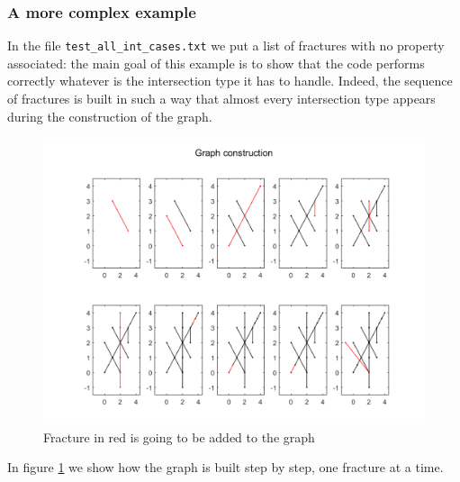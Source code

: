 \documentclass[10pt]{article} %
\begin{document}
	\subsubsection{A more complex example}
	In the file \texttt{test\_all\_int\_cases.txt} we put a list of fractures with no property associated: the main goal of this example is to show that the code performs correctly whatever is the intersection type it has to handle. Indeed, the sequence of fractures is built in such a way that almost every intersection type appears during the construction of the graph. 
	\begin{figure}
		\centering 
		\includegraphics[width=.8\textwidth]{graph_building_process}
		\caption{Fracture in red is going to be added to the graph}
		\label{fig:graph_steps}
	\end{figure}
	In figure \ref{fig:graph_steps} we show how the graph is built step by step, one fracture at a time.
	
\end{document}
